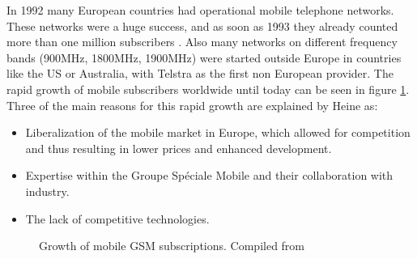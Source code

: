 In 1992 many European countries had operational mobile telephone networks.
These networks were a huge success, and as soon as 1993 they already counted more than one million subscribers \cite{GSM2009}.
Also many networks on different frequency bands (900MHz, 1800MHz, 1900MHz) were started outside Europe in countries like the US or Australia, with Telstra as the first non European provider.
The rapid growth of mobile subscribers worldwide until today can be seen in figure \ref{fig:gsm_growth}.
Three of the main reasons for this rapid growth are explained by Heine \cite{protocols1999} as:
\begin{itemize}
	\item Liberalization of the mobile market in Europe, which allowed for competition and thus resulting in lower prices and enhanced development.
	\item Expertise within the Groupe Sp\'{e}ciale Mobile and their collaboration with industry.
	\item The lack of competitive technologies.
\end{itemize}

\begin{figure}
\centering
{}
\caption{Growth of mobile GSM subscriptions. Compiled from \cite{GSM2009,GSM_history2011,GSM_stats2011}}
\label{fig:gsm_growth}
\end{figure}


